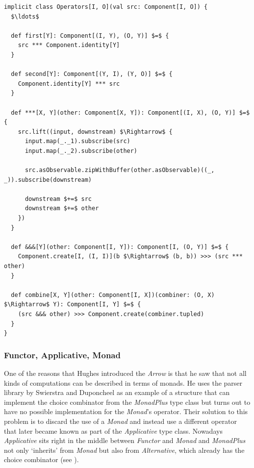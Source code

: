 \begin{minipage}{\linewidth}
\begin{lstlisting}[style=ScalaStyle, caption={New implementation of the \textit{Arrow}'s operators}, label={lst:new-arrow-implementation}]
implicit class Operators[I, O](val src: Component[I, O]) {
  $\ldots$

  def first[Y]: Component[(I, Y), (O, Y)] $=$ {
    src *** Component.identity[Y]
  }

  def second[Y]: Component[(Y, I), (Y, O)] $=$ {
    Component.identity[Y] *** src
  }

  def ***[X, Y](other: Component[X, Y]): Component[(I, X), (O, Y)] $=$ {
    src.lift((input, downstream) $\Rightarrow$ {
      input.map(_._1).subscribe(src)
      input.map(_._2).subscribe(other)

      src.asObservable.zipWithBuffer(other.asObservable)((_, _)).subscribe(downstream)

      downstream $+=$ src
      downstream $+=$ other
    })
  }

  def &&&[Y](other: Component[I, Y]): Component[I, (O, Y)] $=$ {
    Component.create[I, (I, I)](b $\Rightarrow$ (b, b)) >>> (src *** other)
  }

  def combine[X, Y](other: Component[I, X])(combiner: (O, X) $\Rightarrow$ Y): Component[I, Y] $=$ {
    (src &&& other) >>> Component.create(combiner.tupled)
  }
}
\end{lstlisting}
\end{minipage}

\subsubsection{Functor, Applicative, Monad}
One of the reasons that Hughes introduced the \textit{Arrow} \cite{hughes2000-arrows} is that he saw that not all kinds of computations can be described in terms of monads. He uses the parser library by Swierstra and Duponcheel \cite{swierstra1996-parsers} as an example of a structure that can implement the choice combinator from the \textit{MonadPlus} type class but turns out to have no possible implementation for the \textit{Monad}'s \code{(>>=)} operator. Their solution to this problem is to discard the use of a \textit{Monad} and instead use a different operator \code{(<*>)} that later became known as part of the \textit{Applicative} type class. Nowadays \textit{Applicative} sits right in the middle between \textit{Functor} and \textit{Monad} and \textit{MonadPlus} not only `inherits' from \textit{Monad} but also from \textit{Alternative}, which already has the choice combinator (see ).

